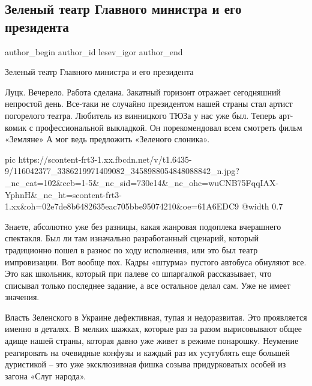  
 
 
 
 
 
\subsection{Зеленый театр Главного министра и его президента}
\label{sec:22_07_2020.fb.lesev_igor.1.luck_terrakt_zelenskii_vladimir}
 
\ifcmt
 author_begin
   author_id lesev_igor
 author_end
\fi

Зеленый театр Главного министра и его президента

Луцк. Вечерело. Работа сделана. Закатный горизонт отражает сегодняшний
непростой день. Все-таки не случайно президентом нашей страны стал артист
погорелого театра. Любитель из винницкого ТЮЗа у нас уже был. Теперь арт-комик
с профессиональной выкладкой. Он порекомендовал всем смотреть фильм «Земляне» А
мог ведь предложить «Зеленого слоника».

\ifcmt
  pic https://scontent-frt3-1.xx.fbcdn.net/v/t1.6435-9/116042377_3386219971409082_3458988054848088842_n.jpg?_nc_cat=102&ccb=1-5&_nc_sid=730e14&_nc_ohc=wuCNB75FqqIAX-YphnH&_nc_ht=scontent-frt3-1.xx&oh=02e7de8b6482635eac705bbe95074210&oe=61A6EDC9
  @width 0.7
\fi

Знаете, абсолютно уже без разницы, какая жанровая подоплека вчерашнего
спектакля. Был ли там изначально разработанный сценарий, который традиционно
пошел в разнос по ходу исполнения, или это был театр импровизации. Вот вообще
пох. Кадры «штурма» пустого автобуса обнуляют все. Это как школьник, который
при палеве со шпаргалкой рассказывает, что списывал только последнее задание, а
все остальное делал сам. Уже не имеет значения.

Власть Зеленского в Украине дефективная, тупая и недоразвитая. Это проявляется
именно в деталях. В мелких шажках, которые раз за разом вырисовывают общее
адище нашей страны, которая давно уже живет в режиме понарошку. Неумение
реагировать на очевидные конфузы и каждый раз их усугублять еще большей
дуристикой – это уже эксклюзивная фишка созыва придурковатых особей из загона
«Слуг народа».

